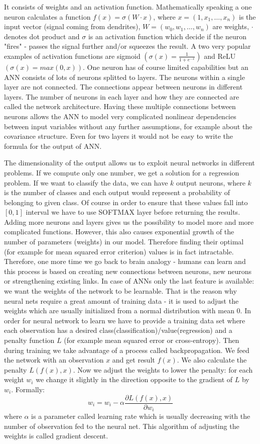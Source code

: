 \documentclass[num-refs]{wiley-article}
\begin{document}
It consists of weights and an activation function. Mathematically speaking a one neuron calculates a function $f(x) = \sigma(W \cdot x)$, where $x = (1, x_1, \ldots, x_n)$ is the input vector (signal coming from dendrites), $W = (w_0, w_1, \ldots, w_n)$ are weights, $\cdot$ denotes dot product and $\sigma$ is an activation function which decide if the neuron "fires" - passes the signal further and/or squeezes the result. A two very popular examples of activation functions are sigmoid $\left(\sigma(x) = \frac{1}{1+e^{-x}}\right)$ and ReLU $\left(\sigma(x) = max(0,x)\right)$. One neuron has of course limited capabilities but an ANN consists of lots of neurons splitted to layers. The neurons within a single layer are not connected. The connections appear between neurons in  different layers. The  number of neurons in each layer and how they are connected are called the network architecture. Having these multiple connections between neurons allows the ANN to model very complicated nonlinear dependencies between input variables without any further assumptions, for example about the covariance structure. Even for two layers it would not be easy to write the formula for the output of ANN. 

The dimensionality of the output allows us to exploit neural networks in different problems. If we compute only one number, we get a solution for a regression problem. If we want to classify the data, we can have $k$ output neurons, where $k$ is the number of classes and each output would represent a probability of belonging to given class. Of course in order to ensure that these values fall into $[0,1]$ interval we have to use SOFTMAX layer before returning the results. Adding more neurons and layers gives us the possibility to model more and more complicated functions. However, this also causes exponential growth of the number of parameters (weights) in our model. Therefore finding their optimal (for example for mean squared error criterion) values is in fact intractable. Therefore, one more time we go back to brain analogy - humans can learn and this process is based on creating new connections between neurons, new neurons or strengthening existing links. In case of ANNs only the last feature is available: we want the weights of the network to be learnable. That is the reason why neural nets require a great amount of training data - it is used to adjust the weights which are usually initialized from a normal distribution with mean $0$. In order for neural network to learn we have to provide a training data set where each observation has a desired class(classification)/value(regression) and a penalty function $L$ (for example mean squared error or cross-entropy). Then during training we take advantage of a process called backpropagation. We feed the network with an observation $x$ and get result $f(x)$. We also calculate the penalty $L(f(x),x)$. Now we adjust the weights to lower the penalty: for each weight $w_i$ we change it slightly in the direction opposite to the gradient of $L$ by $w_i$. Formally:
$$
w_i = w_i - \alpha \frac{\partial L(f(x),x)}{\partial w_i}
$$
where $\alpha$ is a parameter called learning rate which is usually decreasing with the number of observation fed to the neural net. This algorithm of adjusting the weights is called gradient descent.
\end{document}
